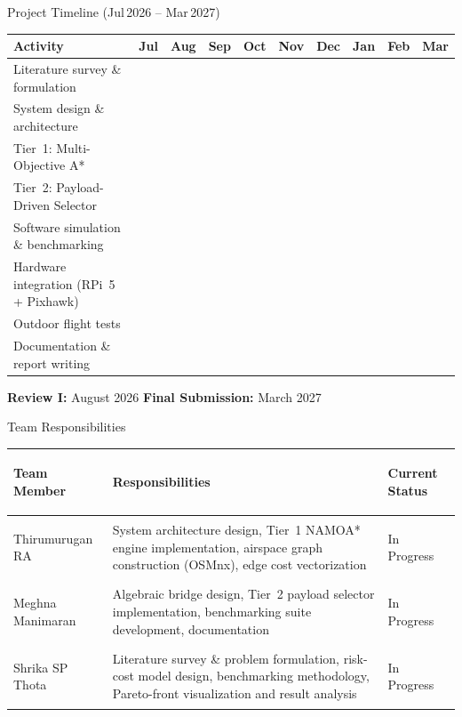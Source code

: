 \documentclass[aspectratio=169,11pt]{beamer}
\begin{document}
\begin{frame}{Project Timeline (Jul\,2026 -- Mar\,2027)}
  \scriptsize
  \begin{tabularx}{\textwidth}{Y*{9}{>{\centering\arraybackslash}p{0.56cm}}}
    \toprule
    \textbf{Activity} &
    \textbf{Jul} & \textbf{Aug} & \textbf{Sep} & \textbf{Oct} &
    \textbf{Nov} & \textbf{Dec} & \textbf{Jan} & \textbf{Feb} &
    \textbf{Mar}\\
    \midrule
    Literature survey \& formulation &
       &  &
       &&&&&&\\
    System design \& architecture &
      &  &  &&&&&& \\
    Tier~1: Multi-Objective A* &&&
       &  &&&&&\\
    Tier~2: Payload-Driven Selector &&&&
       &  &&&&\\
    Software simulation \& benchmarking &&&&&
       &  &&&\\
    Hardware integration (RPi~5 + Pixhawk) &&&&&&
       &  &&\\
    Outdoor flight tests &&&&&&&
       &  &\\
    Documentation \& report writing &&&&&&&
      &  & \\
    \bottomrule
  \end{tabularx}
  \vspace{0.2cm}
  \small
  \textcolor{UniversityBlue}{\textbf{Review I:}} August 2026\qquad
  \textcolor{UniversityBlue}{\textbf{Final Submission:}} March 2027
\end{frame}

\begin{frame}{Team Responsibilities}
  \small
  \begin{tabularx}{\textwidth}{>{\bfseries\raggedright\arraybackslash}p{3.3cm}Y p{2.3cm}}
    \toprule
    Team Member & Responsibilities & Current Status\\
    \midrule
    Thirumurugan RA &
      System architecture design, Tier~1 NAMOA* engine implementation,
      airspace graph construction (OSMnx), edge cost vectorization &
      In Progress\\
    Meghna Manimaran &
      Algebraic bridge design, Tier~2 payload selector implementation,
      benchmarking suite development, documentation &
      In Progress\\
    Shrika SP Thota &
      Literature survey \& problem formulation, risk-cost model design,
      benchmarking methodology, Pareto-front visualization and result analysis &
      In Progress\\
    \bottomrule
  \end{tabularx}
\end{frame}
\end{document}
